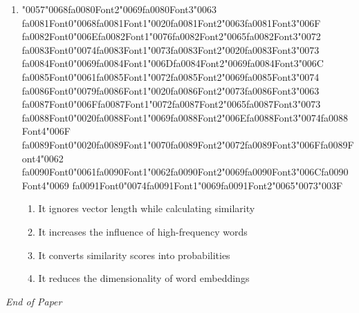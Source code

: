 \documentclass[12pt]{article}
\begin{document}
\begin{enumerate}[label=Q\arabic*.]
\item {\char"0057}{\char"0068}{\csname fa0080Font2\endcsname\char"0069}{\csname fa0080Font3\endcsname\char"0063} {\csname fa0081Font0\endcsname\char"0068}{\csname fa0081Font1\endcsname\char"0020}{\csname fa0081Font2\endcsname\char"0063}{\csname fa0081Font3\endcsname\char"006F} {\csname fa0082Font0\endcsname\char"006E}{\csname fa0082Font1\endcsname\char"0076}{\csname fa0082Font2\endcsname\char"0065}{\csname fa0082Font3\endcsname\char"0072} {\csname fa0083Font0\endcsname\char"0074}{\csname fa0083Font1\endcsname\char"0073}{\csname fa0083Font2\endcsname\char"0020}{\csname fa0083Font3\endcsname\char"0073} {\csname fa0084Font0\endcsname\char"0069}{\csname fa0084Font1\endcsname\char"006D}{\csname fa0084Font2\endcsname\char"0069}{\csname fa0084Font3\endcsname\char"006C} {\csname fa0085Font0\endcsname\char"0061}{\csname fa0085Font1\endcsname\char"0072}{\csname fa0085Font2\endcsname\char"0069}{\csname fa0085Font3\endcsname\char"0074} {\csname fa0086Font0\endcsname\char"0079}{\csname fa0086Font1\endcsname\char"0020}{\csname fa0086Font2\endcsname\char"0073}{\csname fa0086Font3\endcsname\char"0063} {\csname fa0087Font0\endcsname\char"006F}{\csname fa0087Font1\endcsname\char"0072}{\csname fa0087Font2\endcsname\char"0065}{\csname fa0087Font3\endcsname\char"0073} {\csname fa0088Font0\endcsname\char"0020}{\csname fa0088Font1\endcsname\char"0069}{\csname fa0088Font2\endcsname\char"006E}{\csname fa0088Font3\endcsname\char"0074}{\csname fa0088Font4\endcsname\char"006F} {\csname fa0089Font0\endcsname\char"0020}{\csname fa0089Font1\endcsname\char"0070}{\csname fa0089Font2\endcsname\char"0072}{\csname fa0089Font3\endcsname\char"006F}{\csname fa0089Font4\endcsname\char"0062} {\csname fa0090Font0\endcsname\char"0061}{\csname fa0090Font1\endcsname\char"0062}{\csname fa0090Font2\endcsname\char"0069}{\csname fa0090Font3\endcsname\char"006C}{\csname fa0090Font4\endcsname\char"0069} {\csname fa0091Font0\endcsname\char"0074}{\csname fa0091Font1\endcsname\char"0069}{\csname fa0091Font2\endcsname\char"0065}{\char"0073}{\char"003F}
\begin{enumerate}[label=(\Alph*)]
    \item It ignores vector length while calculating similarity
    \item It increases the influence of high-frequency words
    \item It converts similarity scores into probabilities
    \item It reduces the dimensionality of word embeddings
\end{enumerate}
\end{enumerate}

\vfill
\noindent\textit{End of Paper}
\end{document}
